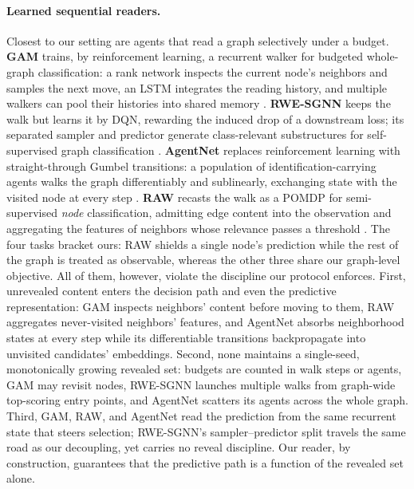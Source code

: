 \paragraph{Learned sequential readers.}
Closest to our setting are agents that read a graph selectively under a budget. \textbf{GAM} trains, by reinforcement learning, a recurrent walker for budgeted whole-graph classification: a rank network inspects the current node's neighbors and samples the next move, an LSTM integrates the reading history, and multiple walkers can pool their histories into shared memory . \textbf{RWE-SGNN} keeps the walk but learns it by DQN, rewarding the induced drop of a downstream loss; its separated sampler and predictor generate class-relevant substructures for self-supervised graph classification . \textbf{AgentNet} replaces reinforcement learning with straight-through Gumbel transitions: a population of identification-carrying agents walks the graph differentiably and sublinearly, exchanging state with the visited node at every step . \textbf{RAW} recasts the walk as a POMDP for semi-supervised \emph{node} classification, admitting edge content into the observation and aggregating the features of neighbors whose relevance passes a threshold . The four tasks bracket ours: RAW shields a single node's prediction while the rest of the graph is treated as observable, whereas the other three share our graph-level objective. All of them, however, violate the discipline our protocol enforces. First, unrevealed content enters the decision path and even the predictive representation: GAM inspects neighbors' content before moving to them, RAW aggregates never-visited neighbors' features, and AgentNet absorbs neighborhood states at every step while its differentiable transitions backpropagate into unvisited candidates' embeddings. Second, none maintains a single-seed, monotonically growing revealed set: budgets are counted in walk steps or agents, GAM may revisit nodes, RWE-SGNN launches multiple walks from graph-wide top-scoring entry points, and AgentNet scatters its agents across the whole graph. Third, GAM, RAW, and AgentNet read the prediction from the same recurrent state that steers selection; RWE-SGNN's sampler--predictor split travels the same road as our decoupling, yet carries no reveal discipline. Our reader, by construction, guarantees that the predictive path is a function of the revealed set alone.

